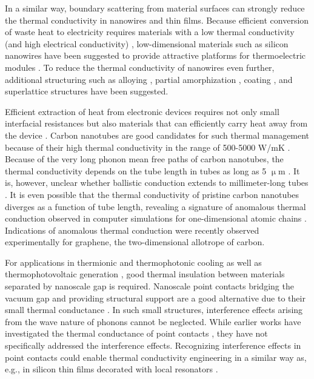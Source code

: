 In a similar way, boundary scattering from material surfaces can strongly reduce the thermal conductivity in nanowires and thin films. Because efficient conversion of waste heat to electricity requires materials with a low thermal conductivity (and high electrical conductivity) \cite{chen}, low-dimensional materials such as silicon nanowires have been suggested to provide attractive platforms for thermoelectric modules \cite{hochbaum08,boukai08}. To reduce the thermal conductivity of nanowires even further, additional structuring such as alloying \cite{garg11}, partial amorphization \cite{donadio09}, coating \cite{hu11}, and superlattice structures \cite{hu12} have been suggested.

Efficient extraction of heat from electronic devices requires not only small interfacial resistances but also materials that can efficiently carry heat away from the device \cite{pop10}. Carbon nanotubes  \cite{iijima91} are good candidates for such thermal management \cite{kumar11} because of their high thermal conductivity in the range of 500-5000 W/mK \cite{marconnet13}. Because of the very long phonon mean free paths of carbon nanotubes, the thermal conductivity depends on the tube length in tubes as long as 5 $\upmu$m \cite{chang08}. It is, however, unclear whether ballistic conduction extends to millimeter-long tubes \cite{marconnet13}. It is even possible that the thermal conductivity of pristine carbon nanotubes diverges as a function of tube length, revealing a signature of anomalous thermal conduction observed in computer simulations for one-dimensional atomic chains \cite{lepri03,mai07,dhar08}. Indications of anomalous thermal conduction were recently observed experimentally \cite{xu14} for graphene, the two-dimensional allotrope of carbon.

For applications in thermionic \cite{zeng06,westover08} and thermophotonic \cite{oksanen08} cooling as well as thermophotovoltaic generation \cite{dimatteo01}, good thermal insulation between materials separated by nanoscale gap is required. Nanoscale point contacts bridging the vacuum gap and providing structural support are a good alternative due to their small thermal conductance \cite{bartsch12}. In such small structures, interference effects arising from the wave nature of phonons cannot be neglected. While earlier works have investigated the thermal conductance of point contacts \cite{bartsch12,jeong12}, they have not specifically addressed the interference effects. Recognizing interference effects in point contacts could enable thermal conductivity engineering in a similar way as, e.g., in silicon thin films decorated with local resonators \cite{davis14}.

